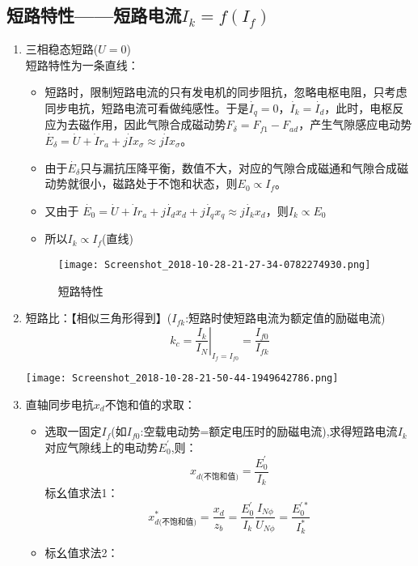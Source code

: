 \documentclass[blue]{elegantnote}
\begin{document}
\subsection{短路特性——短路电流$I_k=f(I_f)$}
\begin{enumerate}
	\item 
	三相稳态短路($U=0$)\\
	短路特性为一条直线：
	\begin{itemize}
		\item 短路时，限制短路电流的只有发电机的同步阻抗，忽略电枢电阻，只考虑同步电抗，短路电流可看做纯感性。于是$\dot{I_q}=0$，$\dot{I_k}=\dot{I_d}$，此时，电枢反应为去磁作用，因此气隙合成磁动势$F_{\delta}=F_{f1}-F_{ad}$，产生气隙感应电动势$\dot{E_{\delta}}=\dot{U}+\dot{I}r_a+j\dot{I}x_{\sigma}\approx j\dot{I}x_{\sigma}$。
		\item 由于$\dot{E_{\delta}}$只与漏抗压降平衡，数值不大，对应的气隙合成磁通和气隙合成磁动势就很小，磁路处于不饱和状态，则$E_0 \propto I_f$。
		\item 又由于 $\dot{E_{0}}=\dot{U}+\dot{I}r_a+j\dot{I_d}x_d+j\dot{I_q}x_q\approx j\dot{I_k}x_{d}$，则{\color{blue}$I_k \propto E_0$}
		\item 所以{\color{blue}$I_k \propto I_f$}(直线)
	\end{itemize}
	\begin{figure}[!hbtp]
		\centering
		\texttt{[image: Screenshot\_2018-10-28-21-27-34-0782274930.png]}
		\caption{短路特性}                         
	\end{figure}
	\item	短路比：【相似三角形得到】({\color{thid}$I_{fk}$:短路时使短路电流为额定值的励磁电流})
	$$k_c=\left.\frac{I_k}{I_N}\right|_{I_f=I_{f0}}=\frac{I_{f0}}{I_{fk}}$$	
		\begin{center}  
		\texttt{[image: Screenshot\_2018-10-28-21-50-44-1949642786.png]}
	\end{center}  
	\item	直轴同步电抗{\color{thid}$x_d$不饱和值}的求取：\\
	\begin{itemize}
		\item 选取一固定$I_f$(如{\color{thid}$I_{f0}$:空载电动势=额定电压时的励磁电流}),求得短路电流$I_k$对应气隙线上的电动势$E_0^{'}$,则：
		$$x_{d{\text {(不饱和值)}}}=\frac{E_0^{'}}{I_k}$$
		标幺值求法1：
		$$x_{d{\text {(不饱和值)}}}^{*}=\frac{x_d}{z_b}=\frac{E_0^{'}}{I_k} \frac{I_{N\phi}}{U_{N\phi}}=\frac{E_0^{'*}}{I_k^{*}} $$
		\item 标幺值求法2：\\

\end{itemize}
\end{enumerate}
\end{document}
